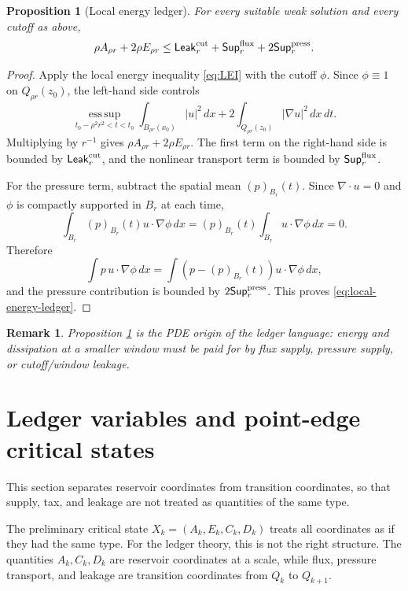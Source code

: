 \documentclass[11pt]{article}
\numberwithin{equation}{section}
\newtheorem{proposition}[theorem]{Proposition}
\newtheorem{remark}[theorem]{Remark}
\newcommand{\Supp}{\mathsf{Sup}}
\newcommand{\Leak}{\mathsf{Leak}}
\newcommand{\dd}{\,d}
\begin{document}
\begin{proposition}[Local energy ledger]\label{prop:local-energy-ledger}
For every suitable weak solution and every cutoff as above,
\begin{equation}\label{eq:local-energy-ledger}
\rho A_{\rho r}+2\rho E_{\rho r}
\leq
\Leak_r^{\rm cut}+\Supp_r^{\rm flux}+2\Supp_r^{\rm press}.
\end{equation}
\end{proposition}

\begin{proof}
Apply the local energy inequality \eqref{eq:LEI} with the cutoff $\phi$.  Since $\phi\equiv1$ on $Q_{\rho r}(z_0)$, the left-hand side controls
\[
\operatorname*{ess\,sup}_{t_0-\rho^2r^2<t<t_0}
\int_{B_{\rho r}(x_0)}|u|^2\dd x
+2\int_{Q_{\rho r}(z_0)}|\nabla u|^2\dd x\dd t.
\]
Multiplying by $r^{-1}$ gives $\rho A_{\rho r}+2\rho E_{\rho r}$.  The first term on the right-hand side is bounded by $\Leak_r^{\rm cut}$, and the nonlinear transport term is bounded by $\Supp_r^{\rm flux}$.

For the pressure term, subtract the spatial mean $(p)_{B_r}(t)$.  Since $\nabla\cdot u=0$ and $\phi$ is compactly supported in $B_r$ at each time,
\[
\int_{B_r} (p)_{B_r}(t)u\cdot\nabla\phi\dd x
=(p)_{B_r}(t)\int_{B_r}u\cdot\nabla\phi\dd x
=0.
\]
Therefore
\[
\int p\,u\cdot\nabla\phi\dd x
=\int (p-(p)_{B_r}(t))u\cdot\nabla\phi\dd x,
\]
and the pressure contribution is bounded by $2\Supp_r^{\rm press}$.  This proves \eqref{eq:local-energy-ledger}.
\end{proof}

\begin{remark}
Proposition \ref{prop:local-energy-ledger} is the PDE origin of the ledger language: energy and dissipation at a smaller window must be paid for by flux supply, pressure supply, or cutoff/window leakage.
\end{remark}

\section{Ledger variables and point-edge critical states}\label{sec:ledger-variables}
\noindent This section separates reservoir coordinates from transition coordinates, so that supply, tax, and leakage are not treated as quantities of the same type.

The preliminary critical state $X_k=(A_k,E_k,C_k,D_k)$ treats all coordinates as if they had the same type.  For the ledger theory, this is not the right structure.  The quantities $A_k,C_k,D_k$ are reservoir coordinates at a scale, while flux, pressure transport, and leakage are transition coordinates from $Q_k$ to $Q_{k+1}$.
\end{document}
